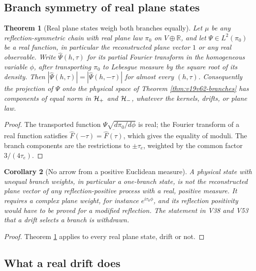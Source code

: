 \documentclass[11pt]{article}
\newtheorem{theorem}{Theorem}[section]
\newtheorem{corollary}[theorem]{Corollary}
\theoremstyle{remark}
\begin{document}
\subsection{Branch symmetry of real plane states}

\begin{theorem}[Real plane states weigh both branches equally]
\label{thm:v19v63-symmetry}
Let \(\mu\) be any reflection-symmetric chain with real plane law
\(\pi_0\) on \(V\oplus\mathbb R\), and let \(\Psi\in L^2(\pi_0)\) be a
real function, in particular the reconstructed plane vector \(1\) or
any real observable.  Write \(\hat\Psi(h,\tau)\) for its partial Fourier
transform in the homogeneous variable \(\phi\), after transporting
\(\pi_0\) to Lebesgue measure by the square root of its density.  Then
\(|\hat\Psi(h,\tau)|=|\hat\Psi(h,-\tau)|\) for almost every
\((h,\tau)\).  Consequently the projection of \(\Psi\) onto the
physical space of Theorem \ref{thm:v19v62-branches} has components of
equal norm in \({\cal H}_+\) and \({\cal H}_-\), whatever the kernels,
drifts, or plane law.
\end{theorem}

\begin{proof}
The transported function \(\Psi\sqrt{d\pi_0/d\phi}\) is real; the
Fourier transform of a real function satisfies
\(\hat F(-\tau)=\overline{\hat F(\tau)}\), which gives the equality of
moduli.  The branch components are the restrictions to \(\pm\tau_e\),
weighted by the common factor \(3/(4\tau_e)\).
\end{proof}

\begin{corollary}[No arrow from a positive Euclidean measure]
\label{cor:v19v63-no-arrow}
A physical state with unequal branch weights, in particular a
one-branch state, is not the reconstructed plane vector of any
reflection-positive process with a real, positive measure.  It
requires a complex plane weight, for instance \(e^{i\tau_0\phi}\), and
its reflection positivity would have to be proved for a modified
reflection.  The statement in V38 and V53 that a drift selects a branch
is withdrawn.
\end{corollary}

\begin{proof}
Theorem \ref{thm:v19v63-symmetry} applies to every real plane state,
drift or not.
\end{proof}

\subsection{What a real drift does}
\end{document}
